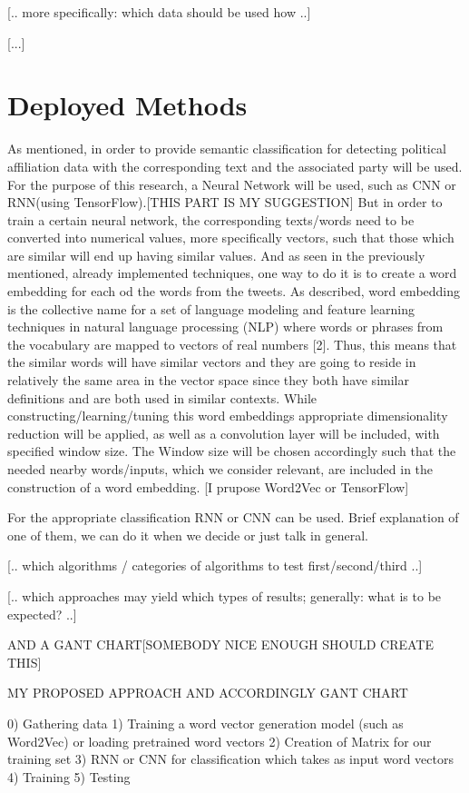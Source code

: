 \documentclass[10pt, oneside]{article}
\begin{document}
[.. more specifically: which data should be used how ..]

[...]



\section{Deployed Methods}


As mentioned, in order to provide semantic classification for detecting political affiliation data with the corresponding text and the associated party will be used. 
For the purpose of this research, a Neural Network will be used, such as CNN or RNN(using TensorFlow).[THIS PART IS MY SUGGESTION]
But in order to train a certain neural network, the corresponding texts/words need to be converted into numerical values, more specifically vectors, such that those which are similar will end up having similar values. And as seen in the previously mentioned, already implemented techniques, one way to do it is to create a word embedding for each od the words from the tweets.
As described, word embedding is the collective name for a set of language modeling and feature learning techniques in natural language processing (NLP) where words or phrases from the vocabulary are mapped to vectors of real numbers [2]. Thus, this means that the similar words will have similar vectors and they are going to reside in relatively the same area in the vector space since they both have similar definitions and are both used in similar contexts.   While constructing/learning/tuning this word embeddings appropriate dimensionality reduction will be applied, as well as a convolution layer will be included, with specified window size.
The Window size will be chosen accordingly such that the needed nearby words/inputs, which we consider relevant, are included in the construction of a word embedding. 
[I prupose Word2Vec or TensorFlow]

For the appropriate classification RNN or CNN can be used.
Brief explanation of one of them, we can do it when we decide or just talk in general.




[.. which algorithms / categories of algorithms to test first/second/third ..]

[.. which approaches may yield which types of results; generally: what is to be expected? ..]



AND A GANT CHART[SOMEBODY NICE ENOUGH SHOULD CREATE THIS]

MY PROPOSED APPROACH AND ACCORDINGLY GANT CHART

0) Gathering data
1) Training a word vector generation model (such as Word2Vec) or loading pretrained word vectors
2) Creation of Matrix for our training set
3) RNN or CNN for classification which takes as input word vectors
4) Training 
5) Testing





\end{document}
